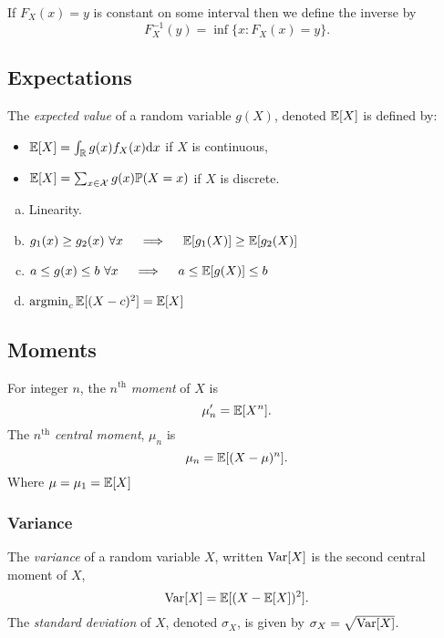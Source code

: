 If $F_X(x) = y$ is constant on some interval then we define the inverse by 
\[
    F_X^{-1}(y) = \inf \{x: F_X(x) = y\}.
\]

\subsection{Expectations}

\begin{definition}
    The \emph{expected value} of a random variable $g(X)$, denoted $\mathbb{E}{}[X]$ is defined by:
    \begin{itemize}[-]
        \item $\mathbb{E}{}[X] = \int_{\mathbb{R}{}}g(x)f_X(x)\text{d}{}x$ if $X$ is continuous,
        \item $\mathbb{E}{}[X] = \sum_{x \in \mathcal{X}{}}g(x)\mathbb{P}{}(X = x)$ if $X$ is discrete.
    \end{itemize}
\end{definition}

\begin{theorem}
    \begin{enumerate}[a.]
        \item Linearity.
        \item $g_1(x) \geq g_2(x) \,\, \forall x \quad \implies \quad \mathbb{E}{}[g_1(X)] \geq \mathbb{E}{}[g_2(X)]$
        \item $a \leq g(x) \leq b \,\, \forall x \quad \implies \quad a \leq \mathbb{E}[g(X)] \leq b $
        \item $\operatorname*{argmin}_{c}\mathbb{E}{}[(X - c)^2] = \mathbb{E}{}[X]$
    \end{enumerate}
\end{theorem}

\subsection{Moments}

\begin{definition}[Moment]
    For integer $n$, the $n^{\mathrm{th}}$ \emph{moment} of $X$ is
    \[
        \mu_n' = \mathbb{E}{}[X^n].
    \]
    The $n^{\mathrm{th}}$ \emph{central moment}, $\mu_n$ is 
    \[
        \mu_n = \mathbb{E}[(X - \mu)^n].
    \]
    Where $\mu = \mu_1 = \mathbb{E}{}[X]$
\end{definition}

\subsubsection{Variance}
\begin{definition}[Variance]
    The \emph{variance} of a random variable $X$, written $\text{Var}{}[X]$ is the second central moment of $X$,
    \[
        \text{Var}{}[X] = \mathbb{E}{}[(X - \mathbb{E}{}[X])^2].
    \]
    The \emph{standard deviation} of $X$, denoted $\sigma_X$, is given by $\sigma_X = \sqrt{\text{Var}{}[X]}$.
\end{definition}

